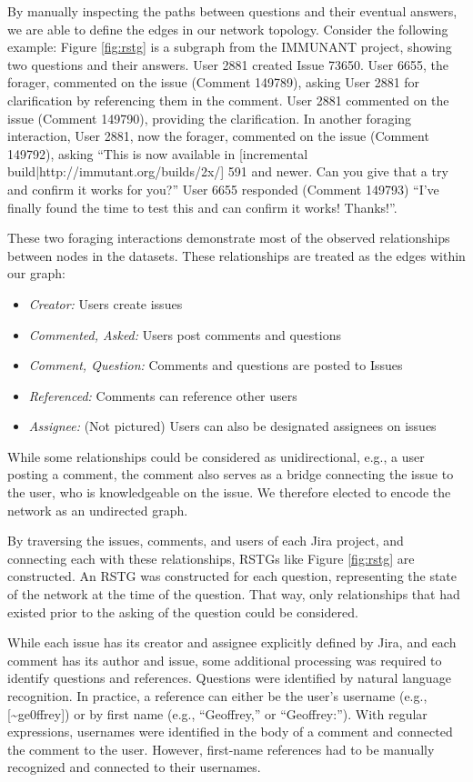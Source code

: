 \documentclass[conference]{IEEEtran}
\begin{document}
By manually inspecting the paths between questions and their eventual answers, we are able to define the edges in our network topology. Consider the following example: Figure \ref{fig:rstg} is a subgraph from the IMMUNANT project, showing two questions and their answers. User 2881 created Issue 73650. User 6655, the forager, commented on the issue (Comment 149789), asking User 2881 for clarification by referencing them in the comment. User 2881 commented on the issue (Comment 149790), providing the clarification. In another foraging interaction, User 2881, now the forager, commented on the issue (Comment 149792), asking ``This is now available in [incremental build|http://immutant.org/builds/2x/] 591 and newer. Can you give that a try and confirm it works for you?'' User 6655 responded (Comment 149793) ``I've finally found the time to test this and can confirm it works! Thanks!''. 

These two foraging interactions demonstrate most of the observed relationships between nodes in the datasets. These relationships are treated as the edges within our graph:
\begin{itemize}
  \item \textit{Creator:} Users create issues
  \item \textit{Commented, Asked: }Users post comments and questions
  \item \textit{Comment, Question:} Comments and questions are posted to Issues
  \item \textit{Referenced:} Comments can reference other users
  \item \textit{Assignee:} (Not pictured) Users can also be designated assignees on issues 
\end{itemize}
While some relationships could be considered as unidirectional, e.g., a user posting a comment, the comment also serves as a bridge connecting the issue to the user, who is knowledgeable on the issue. We therefore elected to encode the network as an undirected graph.

By traversing the issues, comments, and users of each Jira project, and connecting each with these relationships, RSTGs like Figure \ref{fig:rstg} are constructed. An RSTG was constructed for each question, representing the state of the network at the time of the question. That way, only relationships that had existed prior to the asking of the question could be considered.

While each issue has its creator and assignee explicitly defined by Jira, and each comment has its author and issue, some additional processing was required to identify questions and references. Questions were identified by natural language recognition. In practice, a reference can either be the user's username (e.g., [\textasciitilde ge0ffrey]) or by first name (e.g., ``Geoffrey,'' or ``Geoffrey:''). With regular expressions, usernames were identified in the body of a comment and connected the comment to the user. However, first-name references had to be manually recognized and connected to their usernames. 
\end{document}
